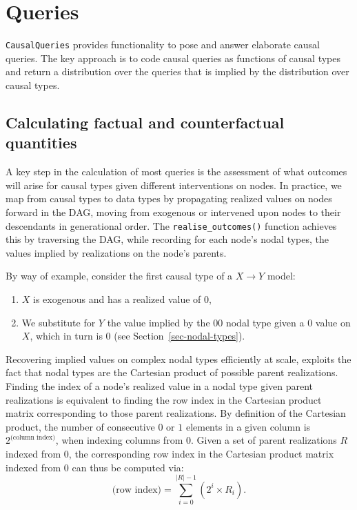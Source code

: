 \documentclass[
  11pt,
  article]{jss}
\providecommand{\tightlist}{%
  \setlength{\itemsep}{0pt}\setlength{\parskip}{0pt}}\usepackage{longtable,booktabs,array}
\begin{document}
\hypertarget{sec-query}{%
\section{Queries}\label{sec-query}}

\texttt{CausalQueries} provides functionality to pose and answer
elaborate causal queries. The key approach is to code causal queries as
functions of causal types and return a distribution over the queries
that is implied by the distribution over causal types.

\hypertarget{sec-propagation}{%
\subsection{Calculating factual and counterfactual
quantities}\label{sec-propagation}}

A key step in the calculation of most queries is the assessment of what
outcomes will arise for causal types given different interventions on
nodes. In practice, we map from causal types to data types by
propagating realized values on nodes forward in the DAG, moving from
exogenous or intervened upon nodes to their descendants in generational
order. The \texttt{realise\_outcomes()} function achieves this by
traversing the DAG, while recording for each node's nodal types, the
values implied by realizations on the node's parents.

By way of example, consider the first causal type of a
\(X \rightarrow Y\) model:

\begin{enumerate}
\def\labelenumi{\arabic{enumi}.}
\tightlist
\item
  \(X\) is exogenous and has a realized value of \(0\),
\item
  We substitute for \(Y\) the value implied by the \(00\) nodal type
  given a \(0\) value on \(X\), which in turn is \(0\) (see
  Section~\ref{sec-nodal-types}).
\end{enumerate}

Recovering implied values on complex nodal types efficiently at scale,
exploits the fact that nodal types are the Cartesian product of possible
parent realizations. Finding the index of a node's realized value in a
nodal type given parent realizations is equivalent to finding the row
index in the Cartesian product matrix corresponding to those parent
realizations. By definition of the Cartesian product, the number of
consecutive \(0\) or \(1\) elements in a given column is
\(2^{\text{(column index)}}\), when indexing columns from \(0\). Given a
set of parent realizations \(R\) indexed from \(0\), the corresponding
row index in the Cartesian product matrix indexed from \(0\) can thus be
computed via:
\[\text{(row index)} = \sum_{i = 0}^{|R| - 1} (2^{i} \times R_i).\]
\end{document}
